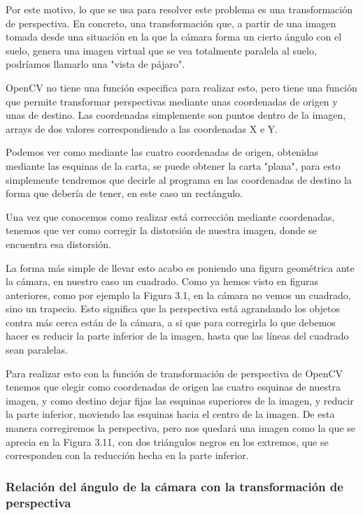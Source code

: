 Por este motivo, lo que se usa para resolver este problema es una transformación de perspectiva. En concreto, una transformación que, a partir de una imagen tomada desde una situación en la que la cámara forma un cierto ángulo con el suelo, genera una imagen virtual que se vea totalmente paralela al suelo, podríamos llamarlo una "vista de pájaro".


OpenCV no tiene una función especifica para realizar esto, pero tiene una función que permite transformar perspectivas mediante unas coordenadas de origen y unas de destino\cite{persp_trans}. Las coordenadas simplemente son puntos dentro de la imagen, arrays de dos valores correspondiendo a las coordenadas X e Y.


Podemos ver como mediante las cuatro coordenadas de origen, obtenidas mediante las esquinas de la carta, se puede obtener la carta "plana", para esto simplemente tendremos que decirle al programa en las coordenadas de destino la forma que debería de tener, en este caso un rectángulo.

Una vez que conocemos como realizar está corrección mediante coordenadas, tenemos que ver como corregir la distorsión de nuestra imagen, donde se encuentra esa distorsión.

La forma más simple de llevar esto acabo es poniendo una figura geométrica ante la cámara, en nuestro caso un cuadrado. Como ya hemos visto en figuras anteriores, como por ejemplo la Figura 3.1, en la cámara no vemos un cuadrado, sino un trapecio. Esto significa que la perspectiva está agrandando los objetos contra más cerca están de la cámara, a si que para corregirla lo que debemos hacer es reducir la parte inferior de la imagen, hasta que las líneas del cuadrado sean paralelas.

Para realizar esto con la función de transformación de perspectiva de OpenCV tenemos que elegir como coordenadas de origen las cuatro esquinas de nuestra imagen, y como destino dejar fijas las esquinas superiores de la imagen, y reducir la parte inferior, moviendo las esquinas hacia el centro de la imagen. De esta manera corregiremos la perspectiva, pero nos quedará una imagen como la que se aprecia en la Figura 3.11, con dos triángulos negros en los extremos, que se corresponden con la reducción hecha en la parte inferior.

\subsubsection{Relación del ángulo de la cámara con la transformación de perspectiva}

